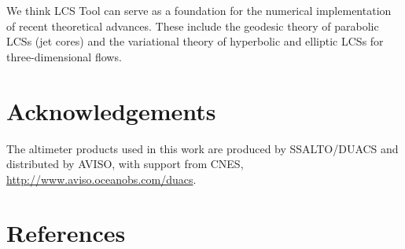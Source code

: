 \documentclass[5p]{elsarticle}
\begin{document}
We think LCS Tool can serve as a foundation for the numerical implementation of recent theoretical advances.
These include the geodesic theory of parabolic LCSs (jet cores)\citep{farazmand14:_shearless} and the variational theory of hyperbolic and elliptic LCSs for three-dimensional flows\citep{blazevski14:_hyper_ellip_trans_barrier_three}.

\section*{Acknowledgements}

\begin{sloppypar}
The altimeter products used in this work are produced by SSALTO/DUACS and distributed by AVISO, with support from CNES, \url{http://www.aviso.oceanobs.com/duacs}.
\end{sloppypar}

\section*{References}

 

\end{document}
